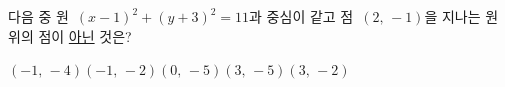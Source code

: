 다음 중 원~$(x-1)^2+(y+3)^2=11$과 중심이 같고 점~$(2,\,-1)$을 지나는 원 위의 점이 \underline{아닌} 것은?
\begin{choicesii}{$(-1,\,-4)$}{$(-1,\,-2)$}{$(0,\,-5)$}{$(3,\,-5)$}{$(3,\,-2)$}\end{choicesii}
